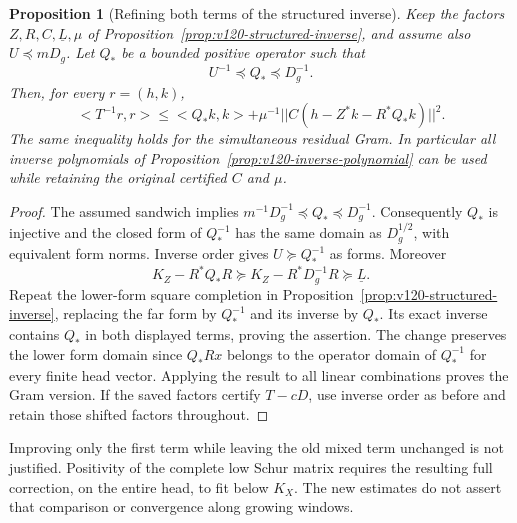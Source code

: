 \documentclass[11pt]{article}
\def\norm#1{||#1||}%
\def\ip#1#2{<#1,#2>}%
\newtheorem{proposition}[theorem]{Proposition}
\theoremstyle{remark}
\newcommand{\norm}[1]{\left\lVert #1\right\rVert}
\newcommand{\ip}[2]{\left\langle #1,#2\right\rangle}
\begin{document}
\begin{proposition}[Refining both terms of the structured inverse]
\label{prop:v122-refined-structured}
Keep the factors $Z,R,C,\underline L,\mu$ of
Proposition~\ref{prop:v120-structured-inverse}, and assume also
$U\preceq mD_g$. Let $Q_*$ be a bounded positive operator such
that
\[
 U^{-1}\preceq Q_*\preceq D_g^{-1}.
\]
Then, for every $r=(h,k)$,
\begin{equation}\label{eq:v122-refined-structured}
 \ip{T^{-1}r}{r}
 \le\ip{Q_*k}{k}
       +\mu^{-1}\norm{C(h-Z^*k-R^*Q_*k)}^2.
\end{equation}
The same inequality holds for the simultaneous residual Gram.
In particular all inverse polynomials of
Proposition~\ref{prop:v120-inverse-polynomial} can be used while
retaining the original certified $C$ and $\mu$.
\end{proposition}
\begin{proof}
The assumed sandwich implies
$m^{-1}D_g^{-1}\preceq Q_*\preceq D_g^{-1}$.
Consequently $Q_*$ is injective and the closed form of $Q_*^{-1}$
has the same domain as $D_g^{1/2}$, with equivalent form norms.
Inverse order gives $U\succeq Q_*^{-1}$ as forms. Moreover
\[
 K_Z-R^*Q_*R\succeq K_Z-R^*D_g^{-1}R\succeq\underline L.
\]
Repeat the lower-form square completion in
Proposition~\ref{prop:v120-structured-inverse}, replacing the far
form by $Q_*^{-1}$ and its inverse by $Q_*$. Its exact inverse
contains $Q_*$ in both displayed terms, proving the assertion.
The change preserves the lower form domain since $Q_*Rx$ belongs
to the operator domain of $Q_*^{-1}$ for every finite head vector.
Applying the result to all linear combinations proves the Gram
version. If the saved factors certify $T-cD$, use inverse order
as before and retain those shifted factors throughout.
\end{proof}

Improving only the first term while leaving the old mixed term
unchanged is not justified. Positivity of the complete low Schur
matrix requires the resulting full correction, on the entire head,
to fit below $K_X$. The new estimates do not assert that comparison
or convergence along growing windows.
\end{document}
